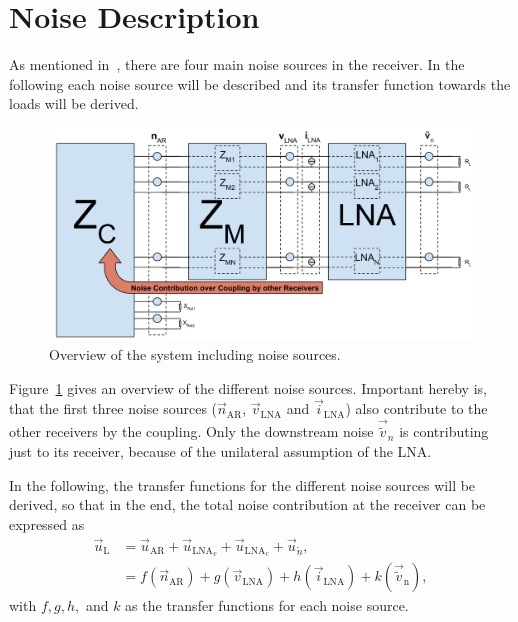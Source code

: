\section{Noise Description}
\label{sec:noise_description}

As mentioned in~\cite{Yahia2013}, there are four main noise sources in the receiver.
In the following each noise source will be described and its transfer function towards the loads will be derived. 
\begin{figure}[h]
\begin{center}
\includegraphics[width=\textwidth]{images/Full_Receiver_noise.png}
\caption{Overview of the system including noise sources.}
\label{fig:receiver_noise}
\end{center}
\end{figure}

Figure~\ref{fig:receiver_noise} gives an overview of the different noise sources.
Important hereby is, that the first three noise sources ($\vec{n}_\text{AR}$, $\vec{v}_\text{LNA}$ and $\vec{i}_\text{LNA}$) also contribute to the other receivers by the coupling.
Only the downstream noise $\vec{\tilde{v}}_n$ is contributing just to its receiver, because of the unilateral assumption of the LNA.

In the following, the transfer functions for the different noise sources will be derived, so that in the end, the total noise contribution at the receiver can be expressed as
\begin{align}\nonumber
\label{eq:noise_contrib}
\vec{u}_\text{L} &= \vec{u}_\text{AR} + \vec{u}_{\text{LNA}_v} + \vec{u}_{\text{LNA}_c} + \vec{u}_{\tilde{n}},\\
&= f(\vec{n}_\text{AR}) + g(\vec{v}_\text{LNA}) + h(\vec{i}_\text{LNA}) + k(\vec{\tilde{v}}_\text{n}),
\end{align}
with $f,g,h,$ and $k$ as the transfer functions for each noise source.


